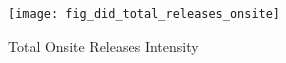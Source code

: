 \begin{figure}[H]
    \centering
    \texttt{[image: fig\_did\_total\_releases\_onsite]}
    \caption{Total Onsite Releases Intensity}
    \label{fig:total-onsite-releases-intensity}
    \begin{minipage}{12cm}
        \vspace{0.05in}
    \end{minipage}
\end{figure}